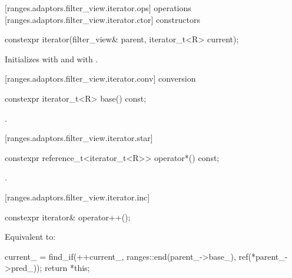 [ranges.adaptors.filter_view.iterator.ops]{ operations}
[ranges.adaptors.filter_view.iterator.ctor]{ constructors}

%
\begin{itemdecl}
constexpr iterator(filter_view& parent, iterator_t<R> current);
\end{itemdecl}

\begin{itemdescr}
\pnum
\effects Initializes  with  and 
with .
\end{itemdescr}

[ranges.adaptors.filter_view.iterator.conv]{ conversion}

%
\begin{itemdecl}
constexpr iterator_t<R> base() const;
\end{itemdecl}

\begin{itemdescr}
\pnum
\returns {}.
\end{itemdescr}

[ranges.adaptors.filter_view.iterator.star]{}

%
\begin{itemdecl}
constexpr reference_t<iterator_t<R>> operator*() const;
\end{itemdecl}

\begin{itemdescr}
\pnum
\returns {}.
\end{itemdescr}

[ranges.adaptors.filter_view.iterator.inc]{}

%
\begin{itemdecl}
constexpr iterator& operator++();
\end{itemdecl}

\begin{itemdescr}
\pnum
\effects Equivalent to:
\begin{codeblock}
current_ = find_if(++current_, ranges::end(parent_->base_), ref(*parent_->pred_));
return *this;
\end{codeblock}
\end{itemdescr}

